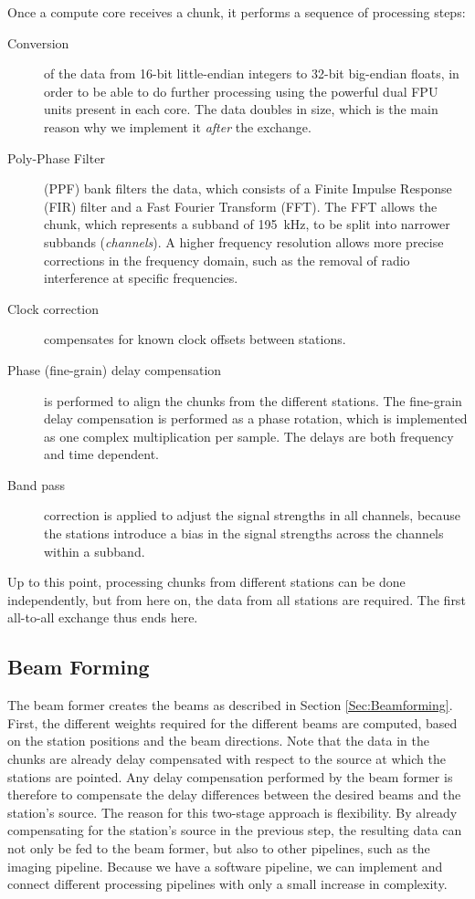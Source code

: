 \documentclass{llncs}
\begin{document}
Once a compute core receives a chunk, it performs a sequence of processing steps:

\begin{description}
\item[Conversion] of the data from 16-bit little-endian integers to 32-bit big-endian floats, in order to be able to do further processing using the powerful dual FPU units present in each core. The data doubles in size, which is the main reason why we implement it \emph{after} the exchange.
\item[Poly-Phase Filter] (PPF) bank filters the data, which consists of a Finite Impulse Response (FIR) filter and a Fast Fourier Transform (FFT). The FFT allows the chunk, which represents a subband of 195~kHz, to be split into narrower subbands (\emph{channels}). A higher frequency resolution allows more precise corrections in the frequency domain, such as the removal of radio interference at specific frequencies.
\item[Clock correction] compensates for known clock offsets between stations.
\item[Phase (fine-grain) delay compensation] is performed to align the chunks from the different stations. The fine-grain delay compensation is performed as a phase rotation, which is implemented as one complex multiplication per sample. The delays are both frequency and time dependent.
\item[Band pass] correction is applied to adjust the signal strengths in all channels, because the stations introduce a bias in the signal strengths across the channels within a subband.
\end{description}

Up to this point, processing chunks from different stations can be done independently, but from here on, the data from all stations are required. The first all-to-all exchange thus ends here.

\subsection{Beam Forming}

The beam former creates the beams as described in Section \ref{Sec:Beamforming}. First, the different weights required for the different beams are computed, based on the station positions and the beam directions. Note that the data in the chunks are already delay compensated with respect to the source at which the stations are pointed. Any delay compensation performed by the beam former is therefore to compensate the delay differences between the desired beams and the station's source. The reason for this two-stage approach is flexibility. By already compensating for the station's source in the previous step, the resulting data can not only be fed to the beam former, but also to other pipelines, such as the imaging pipeline. Because we have a software pipeline, we can implement and connect different processing pipelines with only a small increase in complexity.
\end{document}
